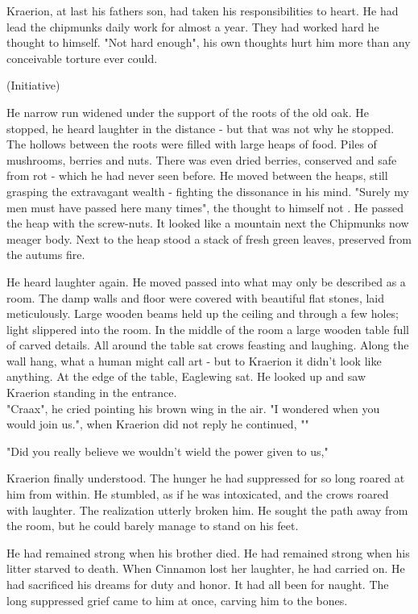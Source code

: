 \documentclass[smalldemyvopaper,11pt,twoside,onecolumn,openright,extrafontsizes]{memoir}
\begin{document}
Kraerion, at last his fathers son, had taken his responsibilities to heart. He had lead the chipmunks daily work for almost a year. They had worked hard he thought to himself. "Not hard enough", his own thoughts hurt him more than any conceivable torture ever could. 

(Initiative)

He narrow run widened under the support of the roots of the old oak. He stopped, he heard laughter in the distance - but that was not why he stopped. The hollows between the roots were filled with large heaps of food. Piles of mushrooms, berries and nuts. There was even dried berries, conserved and safe from rot - which he had never seen before. He moved between the heaps, still grasping the extravagant wealth - fighting the dissonance in his mind. "Surely my men must have passed here many times", the thought to himself not . He passed the heap with the screw-nuts. It looked like a mountain next the Chipmunks now meager body. Next to the heap stood a stack of fresh green leaves, preserved from the autums fire.

He heard laughter again. He moved passed into what may only be described as a room. The damp walls and floor were covered with beautiful flat stones, laid meticulously. Large wooden beams held up the ceiling and through a few holes; light slippered into the room. In the middle of the room a large wooden table full of carved details. All around the table sat crows feasting and laughing. Along the wall hang, what a human might call art - but to Kraerion it didn't look like anything. At the edge of the table, Eaglewing sat. He looked up and saw Kraerion standing in the entrance.\\

"Craax", he cried pointing his brown wing in the air. "I wondered when you would join us.", when Kraerion did not reply he continued, ""


"Did you really believe we wouldn't wield the power given to us,"

Kraerion finally understood. The hunger he had suppressed for so long roared at him from within. He stumbled, as if he was intoxicated, and the crows roared with laughter. The realization utterly broken him. He sought the path away from the room, but he could barely manage to stand on his feet.

He had remained strong when his brother died. He had remained strong when his litter starved to death. When Cinnamon lost her laughter, he had carried on. He had sacrificed his dreams for duty and honor. It had all been for naught. The long suppressed grief came to him at once, carving him to the bones.
\end{document}
